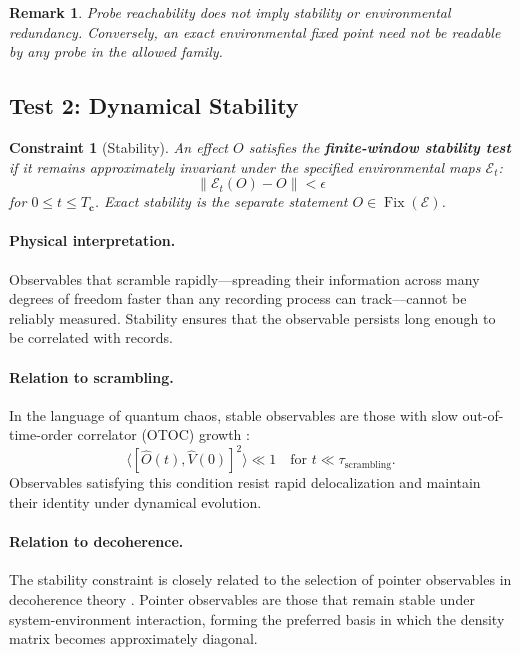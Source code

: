 \documentclass[12pt,a4paper]{article}
\newtheorem{remark}[theorem]{Remark}
\newtheorem{constraint}[theorem]{Constraint}
\begin{document}
\begin{remark}
Probe reachability does not imply stability or environmental redundancy.  Conversely, an exact environmental fixed point need not be readable by any probe in the allowed family.
\end{remark}

\subsection{Test 2: Dynamical Stability}

\begin{constraint}[Stability]
\label{const:stability}
An effect $O$ satisfies the \textbf{finite-window stability test} if it remains approximately invariant under the specified environmental maps $\mathcal{E}_t$:
\begin{equation}
\|\mathcal{E}_t(O) - O\| < \epsilon
\end{equation}
for $0\le t\le T_{\mathbf c}$.  Exact stability is the separate statement $O\in\operatorname{Fix}(\mathcal E)$.
\end{constraint}

\paragraph{Physical interpretation.}
Observables that scramble rapidly---spreading their information across many degrees of freedom faster than any recording process can track---cannot be reliably measured. Stability ensures that the observable persists long enough to be correlated with records.

\paragraph{Relation to scrambling.}
In the language of quantum chaos, stable observables are those with slow out-of-time-order correlator (OTOC) growth \cite{Hayden2007}:
\begin{equation}
\langle [\hat{O}(t), \hat{V}(0)]^2 \rangle \ll 1 \quad \text{for } t \ll \tau_{\text{scrambling}}.
\end{equation}
Observables satisfying this condition resist rapid delocalization and maintain their identity under dynamical evolution.

\paragraph{Relation to decoherence.}
The stability constraint is closely related to the selection of pointer observables in decoherence theory \cite{Zurek2003}. Pointer observables are those that remain stable under system-environment interaction, forming the preferred basis in which the density matrix becomes approximately diagonal.
\end{document}
